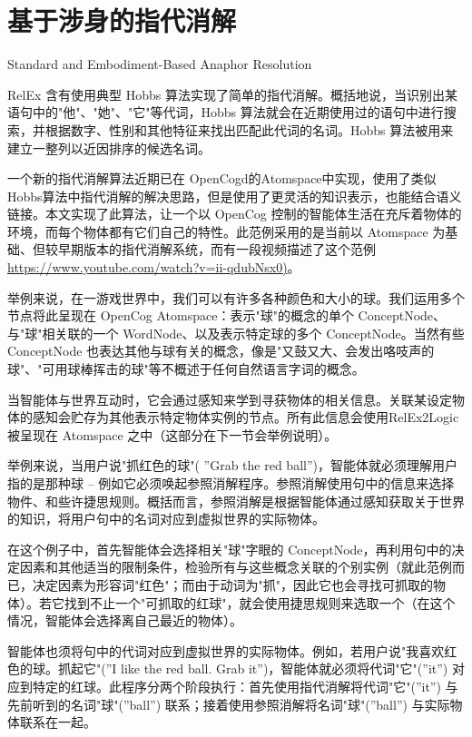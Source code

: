 \section{基于涉身的指代消解}{Standard and Embodiment-Based Anaphor Resolution}

RelEx 含有使用典型 Hobbs 算法实现了简单的指代消解\cite{Hobbs1978}。概括地说，当识别出某语句中的"他"、"她"、"它"等代词，Hobbs 算法就会在近期使用过的语句中进行搜索，并根据数字、性别和其他特征来找出匹配此代词的名词。Hobbs 算法被用来建立一整列以近因排序的候选名词。

一个新的指代消解算法近期已在 OpenCogd的Atomspace中实现，使用了类似Hobbs算法中指代消解的解决思路，但是使用了更灵活的知识表示，也能结合语义链接。本文实现了此算法，让一个以 OpenCog 控制的智能体生活在充斥着物体的环境，而每个物体都有它们自己的特性。此范例采用的是当前以 Atomspace 为基础、但较早期版本的指代消解系统，而有一段视频描述了这个范例\url{https://www.youtube.com/watch?v=ii-qdubNsx0)}。

举例来说，在一游戏世界中，我们可以有许多各种颜色和大小的球。我们运用多个节点将此呈现在 OpenCog Atomspace：表示"球"的概念的单个 ConceptNode、与"球"相关联的一个 WordNode、以及表示特定球的多个 ConceptNode。当然有些 ConceptNode 也表达其他与球有关的概念，像是"又鼓又大、会发出咯吱声的球"、"可用球棒挥击的球"等不概述于任何自然语言字词的概念。

当智能体与世界互动时，它会通过感知来学到寻获物体的相关信息。关联某设定物体的感知会贮存为其他表示特定物体实例的节点。所有此信息会使用RelEx2Logic 被呈现在 Atomspace 之中（这部分在下一节会举例说明）。

举例来说，当用户说"抓红色的球"( ”Grab the red ball”)，智能体就必须理解用户指的是那种球 – 例如它必须唤起参照消解程序。参照消解使用句中的信息来选择物件、和些许捷思规则。概括而言，参照消解是根据智能体通过感知获取关于世界的知识，将用户句中的名词对应到虚拟世界的实际物体。

在这个例子中，首先智能体会选择相关"球"字眼的 ConceptNode，再利用句中的决定因素和其他适当的限制条件，检验所有与这些概念关联的个别实例（就此范例而已，决定因素为形容词"红色"；而由于动词为"抓"，因此它也会寻找可抓取的物体）。若它找到不止一个"可抓取的红球"，就会使用捷思规则来选取一个（在这个情况，智能体会选择离自己最近的物体）。

智能体也须将句中的代词对应到虚拟世界的实际物体。例如，若用户说"我喜欢红色的球。抓起它"(”I like the red ball. Grab it”)，智能体就必须将代词"它"(”it”) 对应到特定的红球。此程序分两个阶段执行：首先使用指代消解将代词"它"(”it”) 与先前听到的名词"球"(”ball”) 联系；接着使用参照消解将名词"球"(”ball”) 与实际物体联系在一起。

